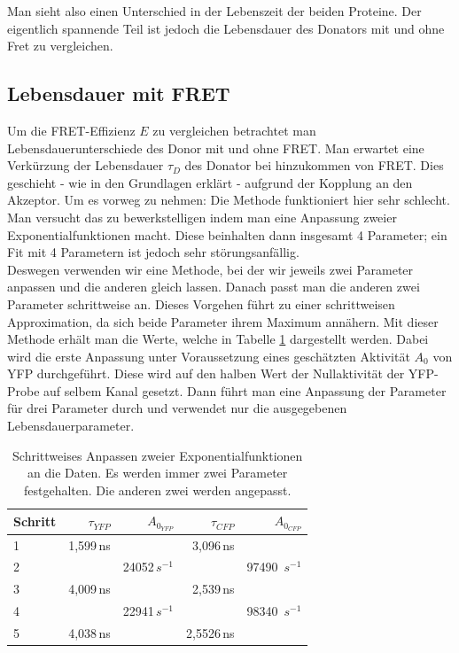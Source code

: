 Man sieht also einen Unterschied in der Lebenszeit der beiden Proteine. Der eigentlich spannende Teil 
ist jedoch die Lebensdauer des Donators mit und ohne Fret zu vergleichen.

\subsection{Lebensdauer mit FRET}

Um die FRET-Effizienz $E$ zu vergleichen betrachtet man Lebensdauerunterschiede des Donor mit und ohne FRET. 
Man erwartet eine Verkürzung der Lebensdauer $\tau_D$ des Donator bei hinzukommen von FRET. Dies geschieht 
- wie in den Grundlagen erklärt - aufgrund der Kopplung an den Akzeptor. Um es vorweg zu nehmen: Die Methode funktioniert hier sehr schlecht. 
Man versucht das zu bewerkstelligen indem man eine Anpassung zweier Exponentialfunktionen macht. Diese beinhalten dann insgesamt 4 Parameter; 
ein Fit mit 4 Parametern ist jedoch sehr störungsanfällig.\\

Deswegen verwenden wir eine Methode, bei der wir jeweils zwei Parameter anpassen und die anderen gleich lassen. Danach passt man die anderen zwei 
Parameter schrittweise an. Dieses Vorgehen führt zu einer schrittweisen Approximation, da sich beide Parameter ihrem Maximum annähern. Mit dieser 
Methode erhält man die Werte, welche in Tabelle \ref{LTFit} dargestellt werden. Dabei wird die erste Anpassung unter Voraussetzung eines geschätzten Aktivität $A_0$ 
von YFP durchgeführt. Diese wird auf den halben Wert der Nullaktivität der YFP-Probe auf selbem Kanal gesetzt. Dann führt man eine Anpassung der 
Parameter für drei Parameter durch und verwendet nur die ausgegebenen Lebensdauerparameter.\\

\begin{table}[h]
    \centering
    \begin{tabular}{l|rr||rr}
        \toprule
        Schritt & $\tau_{YFP}$ & $A_{0_{YFP}} $&  $\tau_{CFP}$ & $A_{0_{CFP}}$\\
        \midrule
        1 & 1,599\,ns & & 3,096\,ns& \\
        2 & & 24052\,$s^{-1}$ & & 97490 \,$s^{-1}$\\
        3 & 4,009\,ns & & 2,539\,ns& \\
        4 & & 22941\,$s^{-1}$ & & 98340 \,$s^{-1}$\\
        5 & 4,038\,ns & & 2,5526\,ns& \\  
        \bottomrule
    \end{tabular}
    \caption{Schrittweises Anpassen zweier Exponentialfunktionen an die Daten. Es werden immer zwei Parameter festgehalten. Die anderen zwei werden 
    angepasst.}
    \label{LTFit}
\end{table}

